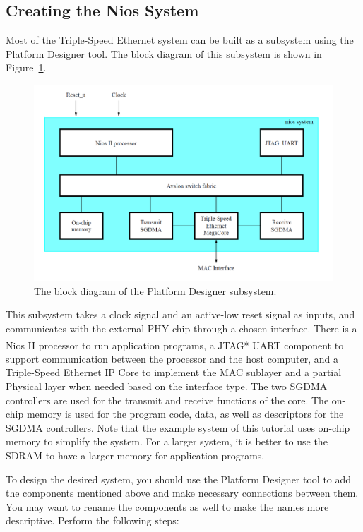\documentclass[11pt, twoside, pdftex]{article}
\begin{document}
\subsection{Creating the Nios\textsuperscript{\textregistered} System}
Most of the Triple-Speed Ethernet system can be built as a subsystem using the Platform Designer tool. The block diagram of this subsystem is shown in Figure~\ref{fig:subsystem_block_diagram}. 

\begin{figure}[H]
	\centering
	  \includegraphics[scale=0.5]{figures/subsystem_block_diagram.png}
	\caption{The block diagram of the Platform Designer subsystem.} 
	\label{fig:subsystem_block_diagram}
\end{figure}

This subsystem takes a clock signal and an active-low reset signal as inputs, and communicates with the external PHY chip through a chosen interface. There is a Nios\textsuperscript{\textregistered} II processor to run application programs, a JTAG* UART component to support communication between the processor and the host computer, and a Triple-Speed Ethernet IP Core to implement the MAC sublayer and a partial Physical layer when needed based on the interface type. The two SGDMA controllers are used for the transmit and receive functions of the core. The on-chip memory is used for the program code, data, as well as descriptors for the SGDMA controllers. Note that the example system of this tutorial uses on-chip memory to simplify the system. For a larger system, it is better to use the SDRAM to have a larger memory for application programs.

To design the desired system, you should use the Platform Designer tool to add the components mentioned above and make necessary connections between them. You may want to rename the components as well to make the names more descriptive. Perform the following steps:
\end{document}

